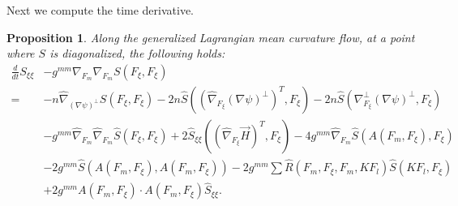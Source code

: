 \documentclass[12pt,letterpaper]{amsart}%
\newcounter{mycounter}
\numberwithin{mycounter}{section}
\theoremstyle{plain}
\newtheorem{proposition}[mycounter]{Proposition}
\numberwithin{equation}{section}
\theoremstyle{definition}
\newcommand{\maxidx}{\mathord{\xi}} %
\begin{document}
Next we compute the time derivative.

\begin{proposition}
Along the generalized Lagrangian mean curvature flow,
at a point where $S$ is diagonalized, the following holds: 
\begin{align}
\frac{d}{dt}S_{\maxidx\maxidx}
& - g^{mm}\nabla_{F_{m}}\nabla_{F_{m}}S(F_{\maxidx},F_{\maxidx})  \label{evolution S}\\
=& -n\hat{\nabla}_{\left( \nabla \psi \right) ^{\perp }}S(F_{\maxidx},F_{\maxidx})
   -2n\hat{S}\left( (\hat{\nabla}_{F_{\maxidx}}\left( \nabla \psi \right) ^{\perp })^{T},
     F_{\maxidx}\right)
   -2n\hat{S}\left( \nabla_{F_{\maxidx}}^{\perp }\left( \nabla \psi \right) ^{\perp },
     F_{\maxidx}\right) \nonumber \\
& - g^{mm}\hat{\nabla}_{F_{m}}\hat{\nabla}_{F_{m}}\hat{S}(F_{\maxidx},F_{\maxidx})
  + 2\hat{S}_{\maxidx\maxidx}\left( (\hat{\nabla}_{F_{\maxidx}}\vec{H})^{T}, F_{\maxidx}\right)
  - 4 g^{mm}\hat{\nabla}_{F_{m}}\hat{S}(A(F_{m},F_{\maxidx}),F_{\maxidx}) \nonumber \\
& - 2 g^{mm}\hat{S}(A(F_{m},F_{\maxidx}),A(F_{m},F_{\maxidx}))
  - 2 g^{mm}\sum \hat{R}(F_{m},F_{\maxidx},F_{m},KF_{l})\hat{S}(KF_{l},F_{\maxidx}) \nonumber \\
& + 2 g^{mm}A(F_{m},F_{\maxidx}) \cdot A(F_{m},F_{\maxidx}) \hat{S}_{\maxidx\maxidx}. \nonumber
\end{align}
\end{proposition}
\end{document}
